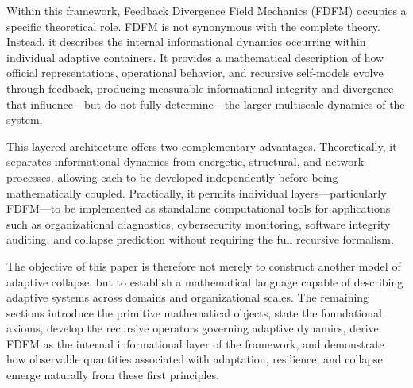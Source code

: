 \documentclass[
]{article}
\begin{document}
Within this framework, Feedback Divergence Field Mechanics (FDFM)
occupies a specific theoretical role. FDFM is not synonymous with the
complete theory. Instead, it describes the internal informational
dynamics occurring within individual adaptive containers. It provides a
mathematical description of how official representations, operational
behavior, and recursive self-models evolve through feedback, producing
measurable informational integrity and divergence that influence---but
do not fully determine---the larger multiscale dynamics of the system.

This layered architecture offers two complementary advantages.
Theoretically, it separates informational dynamics from energetic,
structural, and network processes, allowing each to be developed
independently before being mathematically coupled. Practically, it
permits individual layers---particularly FDFM---to be implemented as
standalone computational tools for applications such as organizational
diagnostics, cybersecurity monitoring, software integrity auditing, and
collapse prediction without requiring the full recursive formalism.

The objective of this paper is therefore not merely to construct another
model of adaptive collapse, but to establish a mathematical language
capable of describing adaptive systems across domains and organizational
scales. The remaining sections introduce the primitive mathematical
objects, state the foundational axioms, develop the recursive operators
governing adaptive dynamics, derive FDFM as the internal informational
layer of the framework, and demonstrate how observable quantities
associated with adaptation, resilience, and collapse emerge naturally
from these first principles.
\end{document}
